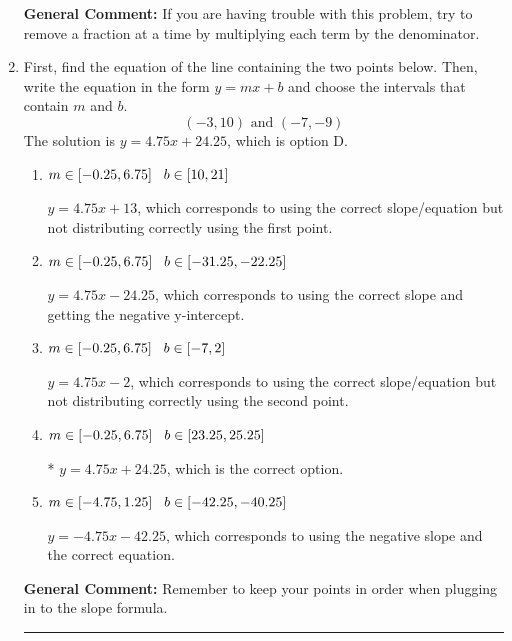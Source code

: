 \documentclass{extbook}[14pt]
\newcommand{\litem}[1]{\item #1

\rule{\textwidth}{0.4pt}}
\begin{document}
\begin{enumerate}
{\textbf{General Comment:} If you are having trouble with this problem, try to remove a fraction at a time by multiplying each term by the denominator.
}
\litem{
First, find the equation of the line containing the two points below. Then, write the equation in the form $ y=mx+b $ and choose the intervals that contain $m$ and $b$.
\[ (-3, 10) \text{ and } (-7, -9) \]The solution is \( y = 4.75x + 24.25 \), which is option D.\begin{enumerate}[label=\Alph*.]
\item \( m \in [-0.25, 6.75] \hspace*{3mm} b \in [10, 21] \)

 $y = 4.75x + 13$, which corresponds to using the correct slope/equation but not distributing correctly using the first point.
\item \( m \in [-0.25, 6.75] \hspace*{3mm} b \in [-31.25, -22.25] \)

 $y = 4.75x -24.25$, which corresponds to using the correct slope and getting the negative y-intercept.
\item \( m \in [-0.25, 6.75] \hspace*{3mm} b \in [-7, 2] \)

 $y = 4.75x -2$, which corresponds to using the correct slope/equation but not distributing correctly using the second point.
\item \( m \in [-0.25, 6.75] \hspace*{3mm} b \in [23.25, 25.25] \)

* $y = 4.75x + 24.25$, which is the correct option.
\item \( m \in [-4.75, 1.25] \hspace*{3mm} b \in [-42.25, -40.25] \)

 $y = -4.75x -42.25$, which corresponds to using the negative slope and the correct equation.
\end{enumerate}

\textbf{General Comment:} Remember to keep your points in order when plugging in to the slope formula.
}
\end{enumerate}
\end{document}
